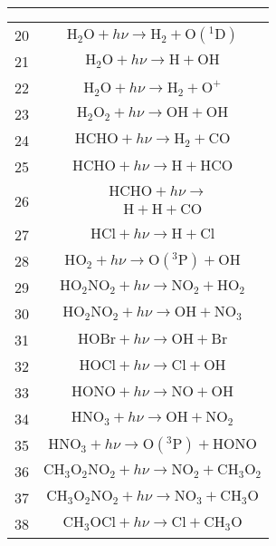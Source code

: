 \begin{longtable}{| m{} | m{} |}
$$\begin{aligned}
\end{aligned}
$$\\
\hline
 20 & $$ \mathrm{H_2O} + h\nu\longrightarrow \mathrm{H_2} + \mathrm{O(^1D)} $$\\
\hline
 21 & $$ \mathrm{H_2O} + h\nu\longrightarrow \mathrm{H} + \mathrm{OH} $$\\
\hline
 22 & $$ \mathrm{H_2O} + h\nu\longrightarrow \mathrm{H_2} + \mathrm{O^+} $$\\
\hline
 23 & $$ \mathrm{H_2O_2} + h\nu\longrightarrow \mathrm{OH} + \mathrm{OH} $$\\
\hline
 24 & $$ \mathrm{HCHO} + h\nu\longrightarrow \mathrm{H_2} + \mathrm{CO} $$\\
\hline
 25 & $$ \mathrm{HCHO} + h\nu\longrightarrow \mathrm{H} + \mathrm{HCO} $$\\
\hline
 26 & $$
\begin{aligned}
&\mathrm{HCHO} + h\nu \longrightarrow \\
&\quad \mathrm{H} + \mathrm{H} + \mathrm{CO}
\end{aligned}
$$\\
\hline
 27 & $$ \mathrm{HCl} + h\nu\longrightarrow \mathrm{H} + \mathrm{Cl} $$\\
\hline
 28 & $$ \mathrm{HO_2} + h\nu\longrightarrow \mathrm{O(^3P)} + \mathrm{OH} $$\\
\hline
 29 & $$ \mathrm{HO_2NO_2} + h\nu\longrightarrow \mathrm{NO_2} + \mathrm{HO_2} $$\\
\hline
 30 & $$ \mathrm{HO_2NO_2} + h\nu\longrightarrow \mathrm{OH} + \mathrm{NO_3} $$\\
\hline
 31 & $$ \mathrm{HOBr} + h\nu\longrightarrow \mathrm{OH} + \mathrm{Br} $$\\
\hline
 32 & $$ \mathrm{HOCl} + h\nu\longrightarrow \mathrm{Cl} + \mathrm{OH} $$\\
\hline
 33 & $$ \mathrm{HONO} + h\nu\longrightarrow \mathrm{NO} + \mathrm{OH} $$\\
\hline
 34 & $$ \mathrm{HNO_3} + h\nu\longrightarrow \mathrm{OH} + \mathrm{NO_2} $$\\
\hline
 35 & $$ \mathrm{HNO_3} + h\nu\longrightarrow \mathrm{O(^3P)} + \mathrm{HONO} $$\\
\hline
 36 & $$ \mathrm{CH_3O_2NO_2} + h\nu\longrightarrow \mathrm{NO_2} + \mathrm{CH_3O_2} $$\\
\hline
 37 & $$ \mathrm{CH_3O_2NO_2} + h\nu\longrightarrow \mathrm{NO_3} + \mathrm{CH_3O} $$\\
\hline
 38 & $$ \mathrm{CH_3OCl} + h\nu\longrightarrow \mathrm{Cl} + \mathrm{CH_3O} $$\\

\end{longtable}
